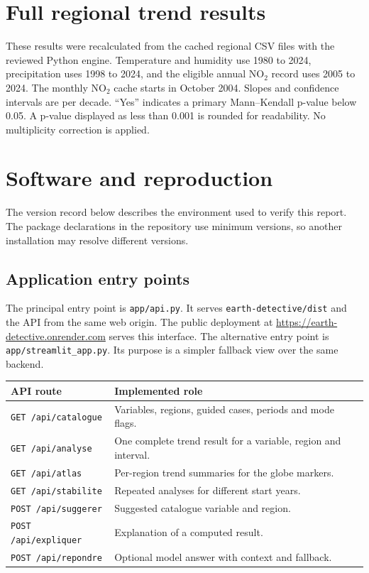 \documentclass[10pt,a4paper,twocolumn]{article}
\newcommand{\code}[1]{\texttt{#1}}
\begin{document}
\clearpage
\section{Full regional trend results}
\label{app:results}
These results were recalculated from the cached regional CSV files with the reviewed Python engine. Temperature and humidity use 1980 to 2024, precipitation uses 1998 to 2024, and the eligible annual NO$_2$ record uses 2005 to 2024. The monthly NO$_2$ cache starts in October 2004. Slopes and confidence intervals are per decade. ``Yes'' indicates a primary Mann--Kendall p-value below 0.05. A p-value displayed as less than 0.001 is rounded for readability. No multiplicity correction is applied.


\clearpage
\section{Software and reproduction}
\label{app:software}
The version record below describes the environment used to verify this report. The package declarations in the repository use minimum versions, so another installation may resolve different versions.


\subsection{Application entry points}
The principal entry point is \code{app/api.py}. It serves \code{earth-detective/dist} and the API from the same web origin. The public deployment at \url{https://earth-detective.onrender.com} serves this interface. The alternative entry point is \code{app/streamlit\_app.py}. Its purpose is a simpler fallback view over the same backend.

\begin{center}\small
\begin{tabularx}{\textwidth}{@{}lX@{}}
\toprule
API route & Implemented role \\
\midrule
\code{GET /api/catalogue} & Variables, regions, guided cases, periods and mode flags. \\
\code{GET /api/analyse} & One complete trend result for a variable, region and interval. \\
\code{GET /api/atlas} & Per-region trend summaries for the globe markers. \\
\code{GET /api/stabilite} & Repeated analyses for different start years. \\
\code{POST /api/suggerer} & Suggested catalogue variable and region. \\
\code{POST /api/expliquer} & Explanation of a computed result. \\
\code{POST /api/repondre} & Optional model answer with context and fallback. \\
\bottomrule
\end{tabularx}
\end{center}
\end{document}
